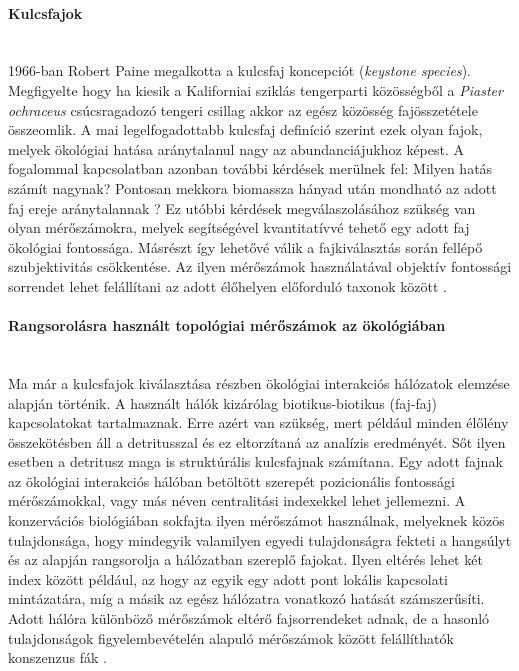 \documentclass[a4paper,12pt]{article}
\begin{document}
	 \paragraph{Kulcsfajok} \mbox{}\\ %
	 1966-ban Robert Paine megalkotta a kulcsfaj koncepciót (\textit{keystone species}). Megfigyelte hogy ha kiesik a Kaliforniai sziklás tengerparti közösségből a \textit{Piaster ochraceus} csúcsragadozó tengeri csillag akkor az egész közösség fajösszetétele összeomlik. A mai legelfogadottabb kulcsfaj definíció szerint ezek olyan fajok, melyek ökológiai hatása aránytalanul nagy az abundanciájukhoz képest. A fogalommal kapcsolatban azonban további kérdések merülnek fel: Milyen hatás számít nagynak? Pontosan mekkora biomassza hányad után mondható az adott faj ereje aránytalannak \cite{new_zeland}? Ez utóbbi kérdések megválaszolásához szükség van olyan mérőszámokra, melyek segítségével kvantitatívvé tehető egy adott faj ökológiai fontossága. Másrészt így lehetővé válik a fajkiválasztás során fellépő szubjektivitás csökkentése. Az ilyen mérőszámok használatával objektív fontossági sorrendet lehet felállítani az adott élőhelyen előforduló taxonok között \cite{jordan_comparison}.

	 \paragraph{Rangsorolásra használt topológiai mérőszámok az ökológiában} \mbox{}\\
	 Ma már a kulcsfajok kiválasztása részben ökológiai interakciós hálózatok elemzése alapján történik. A használt hálók kizárólag biotikus-biotikus (faj-faj) kapcsolatokat tartalmaznak. Erre azért van szükség, mert például minden élőlény összekötésben áll a detritusszal és ez eltorzítaná az analízis eredményét. Sőt ilyen esetben a detritusz maga is struktúrális kulcsfajnak számítana. Egy adott fajnak az ökológiai interakciós hálóban betöltött szerepét pozicionális fontossági mérőszámokkal, vagy más néven centralitási indexekkel lehet jellemezni. A konzervációs biológiában sokfajta ilyen mérőszámot használnak, melyeknek közös tulajdonsága, hogy mindegyik valamilyen egyedi tulajdonságra fekteti a hangsúlyt és az alapján rangsorolja a hálózatban szereplő fajokat. Ilyen eltérés lehet két index között például, az hogy az egyik egy adott pont lokális kapcsolati mintázatára, míg a másik az egész hálózatra vonatkozó hatását számszerűsíti. Adott hálóra különböző mérőszámok eltérő fajsorrendeket adnak, de a hasonló tulajdonságok figyelembevételén alapuló mérőszámok között felállíthatók konszenzus fák \cite{jordan_comparison}.
\end{document}
